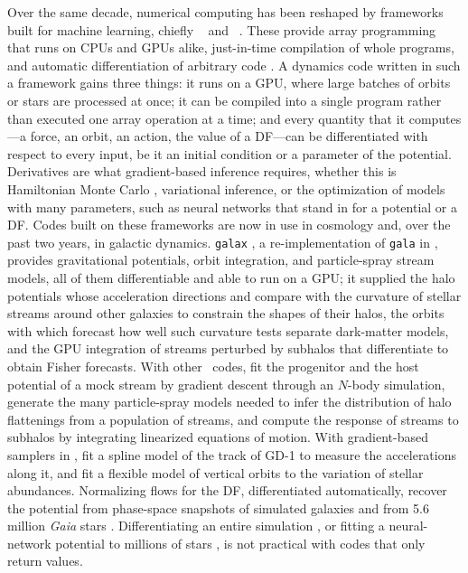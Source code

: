 Over the same decade, numerical computing has been reshaped by
frameworks built for machine learning, chiefly \jax\
\citep{Bradbury2018} and \torch\ \citep{Paszke2019}. These provide
array programming that runs on CPUs and GPUs alike, just-in-time
compilation of whole programs, and automatic differentiation of
arbitrary code \citep[see][for a review]{Baydin2018}. A dynamics code
written in such a framework gains three things: it runs on a GPU, where
large batches of orbits or stars are processed at once; it can be
compiled into a single program rather than executed one array operation
at a time; and every quantity that it computes---a force, an orbit, an
action, the value of a DF---can be differentiated with respect to every
input, be it an initial condition or a parameter of the potential.
Derivatives are what gradient-based inference requires, whether this is
Hamiltonian Monte Carlo \citep{Duane1987,HoffmanGelman2014}, variational
inference, or the optimization of models with many parameters, such as
neural networks that stand in for a potential or a DF. Codes built on
these frameworks are now in use in cosmology
\citep[\eg,][]{Modi2021,Campagne2023,Li2024} and, over the past two
years, in galactic dynamics. \texttt{galax} \citep{Starkman2026}, a
re-implementation of \texttt{gala} in \jax, provides gravitational
potentials, orbit integration, and particle-spray stream models, all of
them differentiable and able to run on a GPU; it supplied the halo
potentials whose acceleration directions \citet{Wu2026b} and
\citet{Euclid2026} compare with the curvature of stellar streams around
other galaxies to constrain the shapes of their halos, the orbits with
which \citet{Starkman2026b} forecast how well such curvature tests
separate dark-matter models, and the GPU integration of streams
perturbed by subhalos that \citet{AnauMontel2026} differentiate to
obtain Fisher forecasts. With other \jax\ codes, \citet{Viterbo2025}
fit the progenitor and the host potential of a mock stream by gradient
descent through an $N$-body simulation, \citet{Chemaly2026} generate
the many particle-spray models needed to infer the distribution of halo
flattenings from a population of streams, and \citet{Nibauer2025}
compute the response of streams to subhalos by integrating linearized
equations of motion. With gradient-based samplers in \jax,
\citet{Nibauer2025b} fit a spline model of the track of GD-1 to measure
the accelerations along it, and \citet{PriceWhelan2025} fit a flexible
model of vertical orbits to the variation of stellar abundances.
Normalizing flows for the DF, differentiated automatically, recover the
potential from phase-space snapshots of simulated galaxies
\citep{Green2023,An2021,Buckley2023} and from 5.6 million \textit{Gaia}
stars \citep{Kalda2025}. Differentiating an entire simulation
\citep{Viterbo2025,AnauMontel2026}, or fitting a neural-network
potential to millions of stars \citep{Kalda2025}, is not practical with
codes that only return values.

